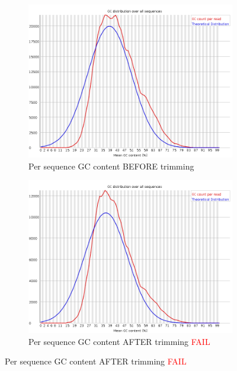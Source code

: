 \documentclass{article}
\begin{document}
\begin{figure}[htbp]
\begin{subfigure}{0.45\linewidth}
\includegraphics[width=\linewidth]{04-D15-22373-HT-Nextera-Myeloid-Val1-Repeat_S4_L001_R1_001_fastqc/Images/per_sequence_gc_content.png}
\caption{Per sequence GC content BEFORE trimming}
\end{subfigure}
\begin{subfigure}{0.45\linewidth}
\includegraphics[width=\linewidth]{04-D15-22373-HT-Nextera-Myeloid-Val1-Repeat_S4_L001_R1_001.qfilter_fastqc/Images/per_sequence_gc_content.png}
\caption{Per sequence GC content AFTER trimming \textcolor{red}{FAIL}}
\end{subfigure}
\end{figure}
\end{document}
